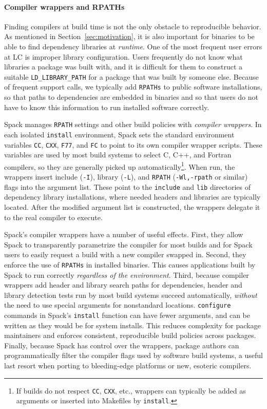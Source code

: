\paragraph{Compiler wrappers and RPATHs}
Finding compilers at build time is not the only obstacle to reproducible
behavior.  As mentioned in Section~\ref{sec:motivation}, it is also important
for binaries to be able to find dependency libraries at {\it runtime}.
One of the most frequent user errors at LC is improper library configuration.
Users frequently do not know what libraries a package was built with, and 
it is difficult for them to construct a suitable {\tt LD\_LIBRARY\_PATH} for
a package that was built by someone else.  Because of frequent support calls,
we typically add {\tt RPATHs} to public software installations, so that paths
to dependencies are embedded in binaries and so that users do not have to know
this information to run installed software correctly.

Spack manages {\tt RPATH} settings and other build policies with
{\it compiler wrappers}. 
In each isolated {\tt install} environment, Spack sets the standard 
environment variables
{\tt CC}, {\tt CXX}, {\tt F77}, and {\tt FC} to point to its own compiler
wrapper scripts.  These variables are used by most build systems to select
C, C++, and Fortran compilers, so they are generally picked up 
automatically\footnote{If builds do not respect {\tt CC}, {\tt CXX}, etc.,
wrappers can typically be added as arguments or inserted into Makefiles
by {\tt install}.}.
When run, the wrappers insert include ({\tt -I}), library ({\tt -L}), and 
{\tt RPATH} ({\tt -Wl,-rpath} or similar) flags into the argument list.
These point to the {\tt include} and {\tt lib} directories of dependency
library installations, where needed headers and libraries are typically located.
After the modified argument list is constructed, the wrappers delegate it
to the real compiler to execute.

Spack's compiler wrappers have a number of useful effects.  First, they allow
Spack to transparently parametrize the compiler for most builds and for
Spack users to easily request a build with a new compiler swapped in.
Second, they enforce the use of {\tt RPATHs} in
installed binaries.  This causes applications built by Spack to run correctly
{\it regardless of the environment}.  Third, because compiler wrappers add 
header and library search paths for dependencies, header and library detection
tests run by most build systems succeed automatically, {\it without}
the need to use special arguments for nonstandard locations.  {\tt configure}
commands in Spack's {\tt install} function can have fewer arguments, and can
be written as they would be for system installs.  This reduces complexity
for package maintainers and enforces consistent, reproducible
build policies across packages.  Finally, because Spack has control over the 
wrappers, package authors can programmatically filter the compiler flags
used by software build systems, a useful last resort when porting to
bleeding-edge platforms or new, esoteric compilers.

